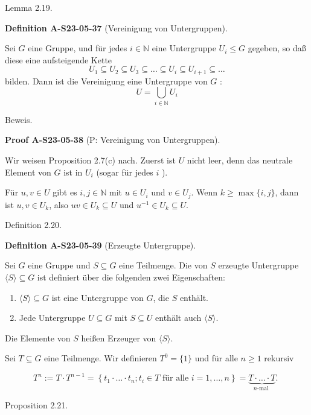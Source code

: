 \documentclass[10pt, letterpaper]{article}
\newcommand{\CustomHeading}[3]{%
  \par\medskip\noindent%
  \textbf{#1 #2} \textnormal{(#3)}.\enskip%
}
\newenvironment{DEF}[2]{\begin{unitbox}\CustomHeading{Definition}{#1}{#2}}{\end{unitbox}}
\newenvironment{PROOF}[2]{\begin{unitbox}\CustomHeading{Proof}{#1}{#2}}{\end{unitbox}}
\begin{document}
Lemma 2.19. 

\begin{DEF}{A-S23-05-37}{Vereinigung von Untergruppen}
Sei $G$ eine Gruppe, und für jedes $i \in \mathbb{N}$ eine Untergruppe $U_{i} \leq G$ gegeben, so daß diese eine aufsteigende Kette
$$
U_{1} \subseteq U_{2} \subseteq U_{3} \subseteq \ldots \subseteq U_{i} \subseteq U_{i+1} \subseteq \ldots
$$
bilden. Dann ist die Vereinigung eine Untergruppe von $G$ :
$$
U=\bigcup_{i \in \mathbb{N}} U_{i}
$$
\end{DEF}

Beweis. 

\begin{PROOF}{A-S23-05-38}{P: Vereinigung von Untergruppen}
Wir weisen Proposition 2.7(c) nach. Zuerst ist $U$ nicht leer, denn das neutrale Element von $G$ ist in $U_{i}$ (sogar für jedes $i$ ).

Für $u, v \in U$ gibt es $i, j \in \mathbb{N}$ mit $u \in U_{i}$ und $v \in U_{j}$. Wenn $k \geq \max \{i, j\}$, dann ist $u, v \in U_{k}$, also $u v \in U_{k} \subseteq U$ und $u^{-1} \in U_{k} \subseteq U$.
\end{PROOF}

Definition 2.20. 


\begin{DEF}{A-S23-05-39}{Erzeugte Untergruppe}
Sei $G$ eine Gruppe und $S \subseteq G$ eine Teilmenge. Die von $S$ erzeugte Untergruppe $\langle S\rangle \subseteq G$ ist definiert über die folgenden zwei Eigenschaften:\\
\begin{enumerate}[label=(\roman*)]
  \item \( \langle S \rangle \subseteq G \) ist eine Untergruppe von \( G \), die \( S \) enthält.

  \item Jede Untergruppe \( U \subseteq G \) mit \( S \subseteq U \) enthält auch \( \langle S \rangle \).
\end{enumerate}
Die Elemente von $S$ heißen Erzeuger von $\langle S\rangle$.
\end{DEF}


Sei $T \subseteq G$ eine Teilmenge. Wir definieren $T^{0}=\{1\}$ und für alle $n \geq 1$ rekursiv

$$
T^{n}:=T \cdot T^{n-1}=\left\{t_{1} \cdot \ldots \cdot t_{n} ; t_{i} \in T \text { für alle } i=1, \ldots, n\right\}=\underbrace{T \cdot \ldots \cdot T}_{n \text {-mal }} \text {. }
$$

Proposition 2.21. 
\end{document}
